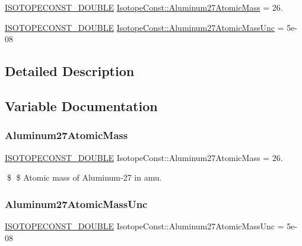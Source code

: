 \begin{DoxyCompactItemize}
\item 
\mbox{\hyperlink{group___isotope_const-_macros_ga8f45a7272ce02c0b4c65c44636ed719a}{I\+S\+O\+T\+O\+P\+E\+C\+O\+N\+S\+T\+\_\+\+D\+O\+U\+B\+LE}} \mbox{\hyperlink{group___isotope_const-_aluminum-_al27_ga9821ae7419fe5dcf8b19e5095ac58c61}{Isotope\+Const\+::\+Aluminum27\+Atomic\+Mass}} = 26.
\item 
\mbox{\hyperlink{group___isotope_const-_macros_ga8f45a7272ce02c0b4c65c44636ed719a}{I\+S\+O\+T\+O\+P\+E\+C\+O\+N\+S\+T\+\_\+\+D\+O\+U\+B\+LE}} \mbox{\hyperlink{group___isotope_const-_aluminum-_al27_ga59588903fa4f0acae457400feec3a8b7}{Isotope\+Const\+::\+Aluminum27\+Atomic\+Mass\+Unc}} = 5e-\/08
\end{DoxyCompactItemize}


\subsection{Detailed Description}


\subsection{Variable Documentation}
\mbox{\label{group___isotope_const-_aluminum-_al27_ga9821ae7419fe5dcf8b19e5095ac58c61}} 
\subsubsection{\texorpdfstring{Aluminum27\+Atomic\+Mass}{Aluminum27AtomicMass}}
{\footnotesize\ttfamily \mbox{\hyperlink{group___isotope_const-_macros_ga8f45a7272ce02c0b4c65c44636ed719a}{I\+S\+O\+T\+O\+P\+E\+C\+O\+N\+S\+T\+\_\+\+D\+O\+U\+B\+LE}} Isotope\+Const\+::\+Aluminum27\+Atomic\+Mass = 26.}

\$ \$ Atomic mass of Aluminum-\/27 in amu. \mbox{\label{group___isotope_const-_aluminum-_al27_ga59588903fa4f0acae457400feec3a8b7}} 
\subsubsection{\texorpdfstring{Aluminum27\+Atomic\+Mass\+Unc}{Aluminum27AtomicMassUnc}}
{\footnotesize\ttfamily \mbox{\hyperlink{group___isotope_const-_macros_ga8f45a7272ce02c0b4c65c44636ed719a}{I\+S\+O\+T\+O\+P\+E\+C\+O\+N\+S\+T\+\_\+\+D\+O\+U\+B\+LE}} Isotope\+Const\+::\+Aluminum27\+Atomic\+Mass\+Unc = 5e-\/08}

